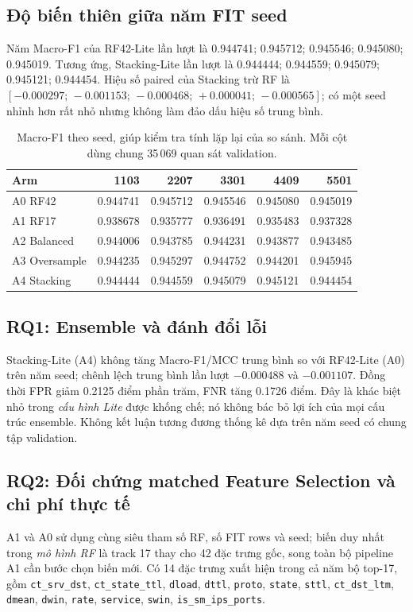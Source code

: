 \subsection{Độ biến thiên giữa năm FIT seed}
Năm Macro-F1 của RF42-Lite lần lượt là 0.944741; 0.945712; 0.945546; 0.945080; 0.945019. Tương ứng, Stacking-Lite lần lượt là 0.944444; 0.944559; 0.945079; 0.945121; 0.944454. Hiệu số paired của Stacking trừ RF là $[-0.000297;\,-0.001153;\,-0.000468;\,+0.000041;\,-0.000565]$; có một seed nhỉnh hơn rất nhỏ nhưng không làm đảo dấu hiệu số trung bình.

\begin{table}[htbp]\centering
\small
\renewcommand{\arraystretch}{1.25}
\setlength{\tabcolsep}{7pt}
\caption{Macro-F1 theo seed, giúp kiểm tra tính lặp lại của so sánh. Mỗi cột dùng chung 35\,069 quan sát validation.}
\label{tab:p21-by-seed}
\begin{tabular}{lrrrrr}
\toprule
Arm & 1103 & 2207 & 3301 & 4409 & 5501\\\midrule
A0 RF42 & 0.944741 & 0.945712 & 0.945546 & 0.945080 & 0.945019\\
A1 RF17 & 0.938678 & 0.935777 & 0.936491 & 0.935483 & 0.937328\\
A2 Balanced & 0.944006 & 0.943785 & 0.944231 & 0.943877 & 0.943485\\
A3 Oversample & 0.944235 & 0.945297 & 0.944752 & 0.944201 & 0.945945\\
A4 Stacking & 0.944444 & 0.944559 & 0.945079 & 0.945121 & 0.944454\\\bottomrule
\end{tabular}
\end{table}

\subsection{RQ1: Ensemble và đánh đổi lỗi}
Stacking-Lite (A4) không tăng Macro-F1/MCC trung bình so với RF42-Lite (A0) trên năm seed; chênh lệch trung bình lần lượt $-0.000488$ và $-0.001107$. Đồng thời FPR giảm 0.2125 điểm phần trăm, FNR tăng 0.1726 điểm. Đây là khác biệt nhỏ trong \emph{cấu hình Lite} được khống chế; nó không bác bỏ lợi ích của mọi cấu trúc ensemble. Không kết luận tương đương thống kê dựa trên năm seed có chung tập validation.

\subsection{RQ2: Đối chứng matched Feature Selection và chi phí thực tế}
A1 và A0 sử dụng cùng siêu tham số RF, số FIT rows và seed; biến duy nhất trong \emph{mô hình RF} là track 17 thay cho 42 đặc trưng gốc, song toàn bộ pipeline A1 cần bước chọn biến mới. Có 14 đặc trưng xuất hiện trong cả năm bộ top-17, gồm \texttt{ct\_srv\_dst}, \texttt{ct\_state\_ttl}, \texttt{dload}, \texttt{dttl}, \texttt{proto}, \texttt{state}, \texttt{sttl}, \texttt{ct\_dst\_ltm}, \texttt{dmean}, \texttt{dwin}, \texttt{rate}, \texttt{service}, \texttt{swin}, \texttt{is\_sm\_ips\_ports}.

